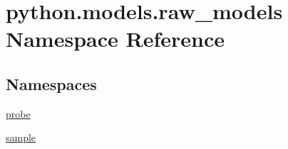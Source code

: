 \hypertarget{namespacepython_1_1models_1_1raw__models}{\section{python.\-models.\-raw\-\_\-models Namespace Reference}
\label{namespacepython_1_1models_1_1raw__models}
}
\subsection*{Namespaces}
\begin{DoxyCompactItemize}
\item 
\hyperlink{namespacepython_1_1models_1_1raw__models_1_1probe}{probe}
\item 
\hyperlink{namespacepython_1_1models_1_1raw__models_1_1sample}{sample}
\end{DoxyCompactItemize}

